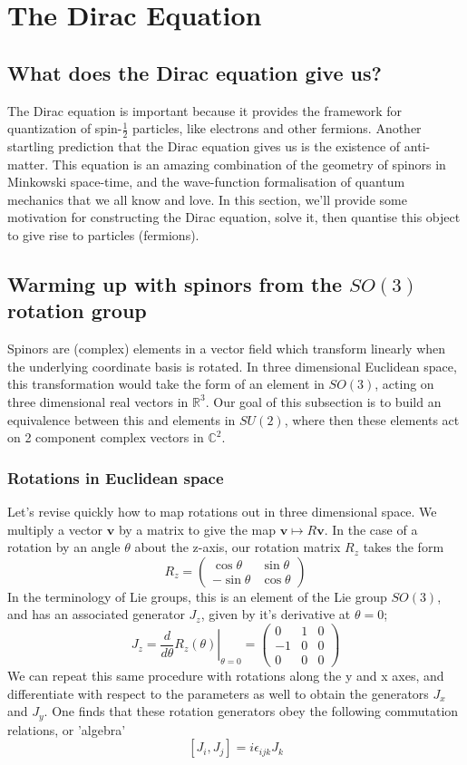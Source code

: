 \documentclass[11pt, oneside]{article}   	%
\theoremstyle{newline}
\theoremstyle{newline}
\theoremstyle{newline}
\theoremstyle{newline}
\theoremstyle{newline}
\begin{document}
\pagebreak
\section{The Dirac Equation}

\subsection{What does the Dirac equation give us?} 
The Dirac equation is important because it provides the framework for quantization of spin-$\frac{1}{ 2}$ particles, like electrons and other fermions. Another startling prediction that the Dirac equation gives us is the existence of anti-matter. This equation is an amazing combination of the geometry of spinors in Minkowski space-time, and the wave-function formalisation of quantum mechanics that we all know and love. 
In this section, we'll provide some motivation for constructing the Dirac equation, solve it, then quantise this object to give rise to particles (fermions). 

\subsection{Warming up with spinors from the $SO(3)$ rotation group} 

Spinors are (complex) elements in a vector field which transform linearly when the underlying coordinate basis is rotated. In three dimensional Euclidean space, this transformation would take the form of an element in $SO(3)$, acting on three dimensional real vectors in $\mathbb{R}^3$. Our goal of this subsection is to build an equivalence between this and elements in $SU(2)$, where then these elements act on 2 component complex vectors in $\mathbb{C}^2$.

\subsubsection{Rotations in Euclidean space} 
Let's revise quickly how to map rotations out in three dimensional space. We multiply a vector $\mathbf{v} $ by a matrix to give the map $\mathbf{v} \mapsto R \mathbf{v}$. In the case of a rotation by an angle $\theta$ about the z-axis, our rotation matrix $R_z$ takes the form \[ R_z = \begin{pmatrix} \cos \theta & \sin \theta \\  - \sin \theta & \cos \theta \end{pmatrix} \] 
In the terminology of Lie groups, this is an element of the Lie group $SO(3)$, and has an associated generator $J_z$, given by it's derivative at $\theta = 0$; 
\[ J_z = \left. \frac{d}{ d\theta } R_z (\theta) \right\vert_{ \theta = 0 }  = \begin{pmatrix} 0 & 1 & 0 \\ -1 & 0 & 0 \\ 0 & 0 & 0 \end{pmatrix}  \]
We can repeat this same procedure with rotations along the y and x axes, and differentiate with respect to the parameters as well to obtain the generators $ J_x $ and $J_y$. One finds that these rotation generators obey the following commutation relations, or 'algebra' \[ [ J_i , J_j ] = i \epsilon_{ ijk} J_k \] 
\end{document}
